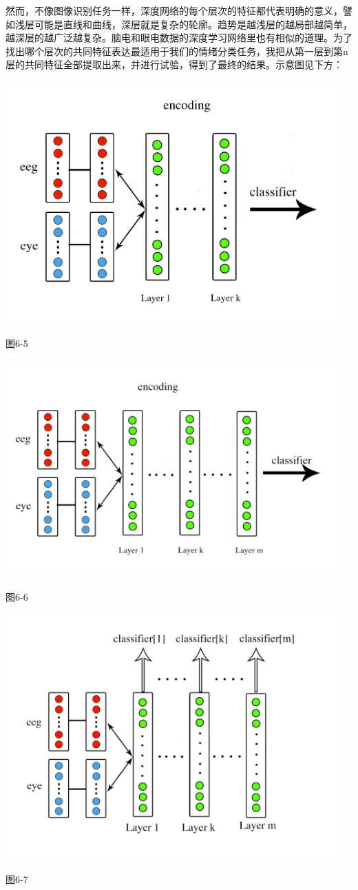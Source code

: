 		然而，不像图像识别任务一样，深度网络的每个层次的特征都代表明确的意义，譬如浅层可能是直线和曲线，深层就是复杂的轮廓。趋势是越浅层的越局部越简单，越深层的越广泛越复杂。脑电和眼电数据的深度学习网络里也有相似的道理。为了找出哪个层次的共同特征表达最适用于我们的情绪分类任务，我把从第一层到第n层的共同特征全部提取出来，并进行试验，得到了最终的结果。示意图见下方：
		\centerline{\includegraphics[width=5in]{figure/classifyk.png}}
		\centerline{图6-5}
		\centerline{\includegraphics[width=5in]{figure/classifyn.png}}
		\centerline{图6-6}
		
		\centerline{\includegraphics[width=5in]{figure/classify_all.png}}
		\centerline{图6-7}
		
